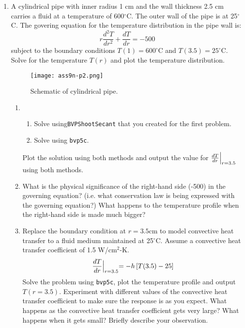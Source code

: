 \begin{fullwidth}
\begin{enumerate}
\item A cylindrical pipe with inner radius 1 cm and the wall thickness 2.5 cm carries a fluid at a temperature of 600$^{\circ}$C. The outer wall of the pipe is at 25$^{\circ}$C.  The govering equation for the temperature distribution in the pipe wall is:
\begin{equation*}
r\frac{d^2T}{dr^2}+\frac{dT}{dr}=-500
\end{equation*}
subject to the boundary conditions $T(1)=600^{\circ}$C and $T(3.5)=25^{\circ}$C.  Solve for the temperature $T(r)$ and plot the temperature distribution.

\begin{figure}[h!]
\centering
\texttt{[image: ass9n-p2.png]}
\caption{Schematic of cylindrical pipe.}
\label{fig:ass9n-p2}
\end{figure}

\begin{enumerate}
\item
\begin{enumerate}
\item Solve using\lstinline[style=myMatlab]{BVPShootSecant} that you created for the first problem.
\item Solve using \lstinline[style=myMatlab]{bvp5c}.
\end{enumerate}
Plot the solution using both methods and output the value for $\frac{dT}{dr}\Bigl|_{r=3.5}$ using both methods.

\item 
What is the physical significance of the right-hand side (-500) in the governing equation?  (i.e. what conservation law is being expressed with the governing equation?) What happens to the temperature profile when the right-hand side is made much bigger?

\item 
Replace the boundary condition at $r=3.5$cm to model convective heat transfer to a fluid medium maintained at 25$^{\circ}$C.  Assume a convective heat transfer coefficient of 1.5 W/cm$^2$-K.  
\begin{equation*}
\frac{dT}{dr}\Bigl|_{r=3.5}=-h\left[T(3.5)-25\right]
\end{equation*}
Solve the problem using \lstinline[style=myMatlab]{bvp5c}, plot the temperature profile and output $T(r=3.5)$.  Experiment with different values of the convective heat transfer coefficient to make sure the response is as you expect.  What happens as the convective heat transfer coefficient gets very large?  What happens when it gets small?  Briefly describe your observation.



\end{enumerate}
\end{enumerate}
\end{fullwidth}
